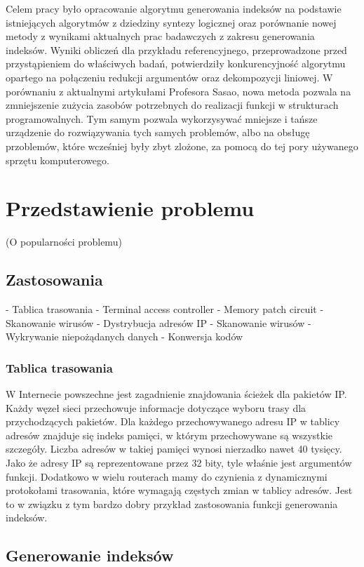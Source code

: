 Celem pracy było opracowanie algorytmu generowania indeksów na podstawie istniejących algorytmów z dziedziny syntezy logicznej
oraz porównanie nowej metody z wynikami aktualnych prac badawczych z zakresu generowania indeksów.
Wyniki obliczeń dla przykładu referencyjnego,
przeprowadzone przed przystąpieniem do właściwych badań,
potwierdziły konkurencyjność algorytmu opartego na połączeniu redukcji argumentów oraz dekompozycji liniowej.
W porównaniu z aktualnymi artykułami Profesora Sasao,
nowa metoda pozwala na zmniejszenie zużycia zasobów potrzebnych do realizacji funkcji w strukturach programowalnych.
Tym samym pozwala wykorzysywać mniejsze i tańsze urządzenie do rozwiązywania tych samych problemów,
albo na obsługę przoblemów, które wcześniej były zbyt zlożone,
za pomocą do tej pory używanego sprzętu komputerowego.

\chapter{Przedstawienie problemu}
(O popularności problemu)

\section{Zastosowania}
- Tablica trasowania
- Terminal access controller
- Memory patch circuit
- Skanowanie wirusów
- Dystrybucja adresów IP
- Skanowanie wirusów
- Wykrywanie niepożądanych danych
- Konwersja kodów

\subsection{Tablica trasowania}
W Internecie powszechne jest zagadnienie znajdowania ścieżek dla pakietów IP.
Każdy węzeł sieci przechowuje informacje dotyczące wyboru trasy dla przychodzących pakietów.
Dla każdego przechowywanego adresu IP w tablicy adresów znajduje się indeks pamięci, w którym przechowywane są wszystkie szczegóły.
Liczba adresów w takiej pamięci wynosi nierzadko nawet 40 tysięcy.
Jako że adresy IP są reprezentowane przez 32 bity, tyle właśnie jest argumentów funkcji.
Dodatkowo w wielu routerach mamy do czynienia z dynamicznymi protokołami trasowania, które wymagają częstych zmian w tablicy adresów.
Jest to w związku z tym bardzo dobry przykład zastosowania funkcji generowania indeksów.

\section{Generowanie indeksów}

